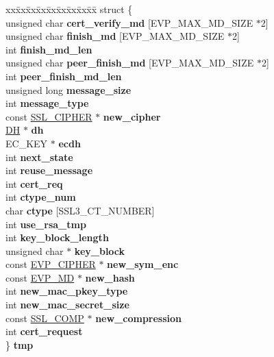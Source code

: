 \begin{DoxyCompactItemize}
\item 
\hypertarget{structssl3__state__st_a4763448e8acec38a44c6791619fadbdb}{}\begin{tabbing}
xx\=xx\=xx\=xx\=xx\=xx\=xx\=xx\=xx\=\kill
struct \{\\
\>unsigned char {\bfseries cert\_verify\_md} \mbox{[}EVP\_MAX\_MD\_SIZE $\ast$2\mbox{]}\\
\>unsigned char {\bfseries finish\_md} \mbox{[}EVP\_MAX\_MD\_SIZE $\ast$2\mbox{]}\\
\>int {\bfseries finish\_md\_len}\\
\>unsigned char {\bfseries peer\_finish\_md} \mbox{[}EVP\_MAX\_MD\_SIZE $\ast$2\mbox{]}\\
\>int {\bfseries peer\_finish\_md\_len}\\
\>unsigned long {\bfseries message\_size}\\
\>int {\bfseries message\_type}\\
\>const \hyperlink{structssl__cipher__st}{SSL\_CIPHER} $\ast$ {\bfseries new\_cipher}\\
\>\hyperlink{structdh__st}{DH} $\ast$ {\bfseries dh}\\
\>EC\_KEY $\ast$ {\bfseries ecdh}\\
\>int {\bfseries next\_state}\\
\>int {\bfseries reuse\_message}\\
\>int {\bfseries cert\_req}\\
\>int {\bfseries ctype\_num}\\
\>char {\bfseries ctype} \mbox{[}SSL3\_CT\_NUMBER\mbox{]}\\
\>int {\bfseries use\_rsa\_tmp}\\
\>int {\bfseries key\_block\_length}\\
\>unsigned char $\ast$ {\bfseries key\_block}\\
\>const \hyperlink{structevp__cipher__st}{EVP\_CIPHER} $\ast$ {\bfseries new\_sym\_enc}\\
\>const \hyperlink{structenv__md__st}{EVP\_MD} $\ast$ {\bfseries new\_hash}\\
\>int {\bfseries new\_mac\_pkey\_type}\\
\>int {\bfseries new\_mac\_secret\_size}\\
\>const \hyperlink{structssl__comp__st}{SSL\_COMP} $\ast$ {\bfseries new\_compression}\\
\>int {\bfseries cert\_request}\\
\} {\bfseries tmp}\label{structssl3__state__st_a4763448e8acec38a44c6791619fadbdb}
\\


\end{tabbing}
\end{DoxyCompactItemize}
